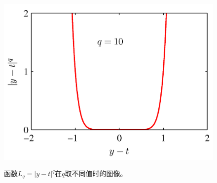 \documentclass[b5paper]{book}
\numberwithin{equation}{chapter}
\begin{document}
{\begin{figure}[ht]
\begin{minipage}[t]{0.5\linewidth}
		\includegraphics[scale=0.8]{Images/1-29d.png}
		\label{fig:1-29d}
		\end{minipage}
		\caption{函数$L_q=|y-t|^q$在$q$取不同值时的图像。}
	\end{figure}
	}
\end{document}
